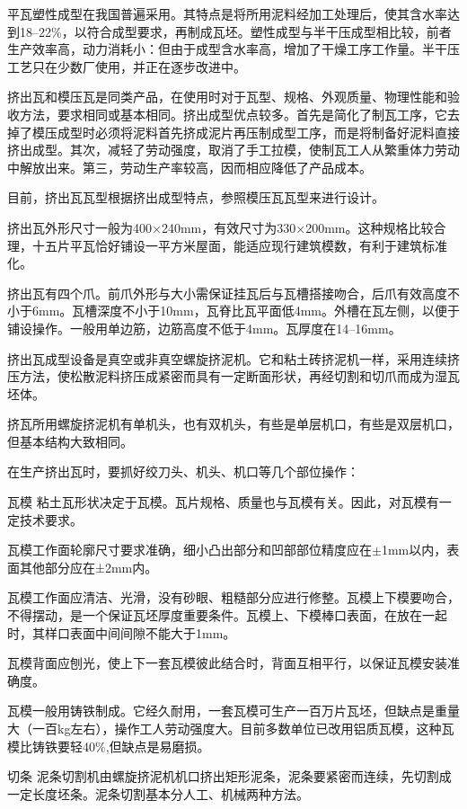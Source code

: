 \documentclass{ctexbook}
\begin{document}
平瓦塑性成型在我国普遍采用。其特点是将所用泥料经加工处理后，使其含水率达到18--22\%，以符合成型要求，再制成瓦坯。塑性成型与半干压成型相比较，前者生产效率高，动力消耗小：但由于成型含水率高，增加了干燥工序工作量。半干压工艺只在少数厂使用，并正在逐步改进中。

挤出瓦和模压瓦是同类产品，在使用时对于瓦型、规格、外观质量、物理性能和验收方法，要求相同或基本相同。挤出成型优点较多。首先是简化了制瓦工序，它去掉了模压成型时必须将泥料首先挤成泥片再压制成型工序，而是将制备好泥料直接挤出成型。其次，减轻了劳动强度，取消了手工拉模，使制瓦工人从繁重体力劳动中解放出来。第三，劳动生产率较高，因而相应降低了产品成本。

目前，挤出瓦瓦型根据挤出成型特点，参照模压瓦瓦型来进行设计。

挤出瓦外形尺寸一般为400$\times$240mm，有效尺寸为330$\times$200mm。这种规格比较合理，十五片平瓦恰好铺设一平方米屋面，能适应现行建筑模数，有利于建筑标准化。

挤出瓦有四个爪。前爪外形与大小需保证挂瓦后与瓦槽搭接吻合，后爪有效高度不小于6mm。瓦槽深度不小于10mm，瓦脊比瓦平面低4mm。外槽在瓦左侧，以便于铺设操作。一般用单边筋，边筋高度不低于4mm。瓦厚度在14--16mm。

挤出瓦成型设备是真空或非真空螺旋挤泥机。它和粘土砖挤泥机一样，采用连续挤压方法，使松散泥料挤压成紧密而具有一定断面形状，再经切割和切爪而成为湿瓦坯体。

挤瓦所用螺旋挤泥机有单机头，也有双机头，有些是单层机口，有些是双层机口，但基本结构大致相同。

在生产挤出瓦时，要抓好绞刀头、机头、机口等几个部位操作：

瓦模 粘土瓦形状决定于瓦模。瓦片规格、质量也与瓦模有关。因此，对瓦模有一定技术要求。

瓦模工作面轮廓尺寸要求准确，细小凸出部分和凹部部位精度应在$\pm$1mm以内，表面其他部分应在±2mm内。

瓦模工作面应清洁、光滑，没有砂眼、粗糙部分应进行修整。瓦模上下模要吻合，不得摆动，是一个保证瓦坯厚度重要条件。瓦模上、下模棒口表面，在放在一起时，其样口表面中间间隙不能大于1mm。

瓦模背面应刨光，使上下一套瓦模彼此结合时，背面互相平行，以保证瓦模安装准确度。

瓦模一般用铸铁制成。它经久耐用，一套瓦模可生产一百万片瓦坯，但缺点是重量大（一百kg左右），操作工人劳动强度大。目前多数单位已改用铝质瓦模，这种瓦模比铸铁要轻40\%,但缺点是易磨损。

切条 泥条切割机由螺旋挤泥机机口挤出矩形泥条，泥条要紧密而连续，先切割成一定长度坯条。泥条切割基本分人工、机械两种方法。
\end{document}
